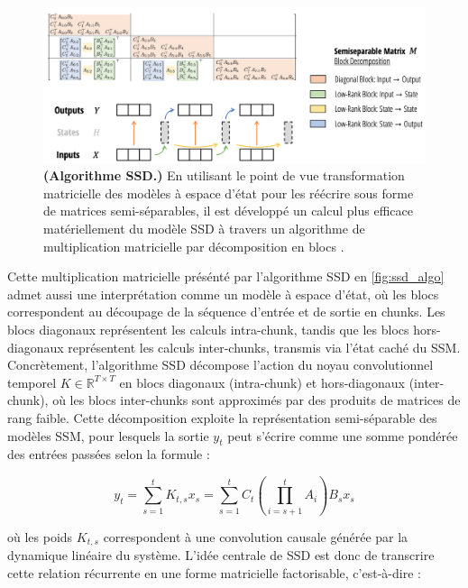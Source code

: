 \begin{figure}[H]
    \centering
    \includegraphics[width=1.0\linewidth]{images/sdd_algorithm.png}
    \caption{\justifying \textbf{(Algorithme SSD.)} En utilisant le point de vue transformation matricielle des modèles à espace d'état pour les réécrire sous forme de matrices semi-séparables, il est développé un calcul plus efficace matériellement du modèle SSD à travers un algorithme de multiplication matricielle par décomposition en blocs \citep{dao2024mamba2}.}
    \label{fig:ssd_algo}
\end{figure}

Cette multiplication matricielle présénté par l'algorithme SSD en \autoref{fig:ssd_algo} admet aussi une interprétation comme un modèle à espace d'état, où les blocs correspondent au découpage de la séquence d'entrée et de sortie en chunks. Les blocs diagonaux représentent les calculs intra-chunk, tandis que les blocs hors-diagonaux représentent les calculs inter-chunks, transmis via l'état caché du SSM. Concrètement, l'algorithme SSD décompose l'action du noyau convolutionnel temporel $K \in \mathbb{R}^{T \times T}$ en blocs diagonaux (intra-chunk) et hors-diagonaux (inter-chunk), où les blocs inter-chunks sont approximés par des produits de matrices de rang faible. Cette décomposition exploite la représentation semi-séparable des modèles SSM, pour lesquels la sortie $y_t$ peut s’écrire comme une somme pondérée des entrées passées selon la formule :

\begin{equation}
y_t = \sum_{s=1}^t K_{t,s} x_s = \sum_{s=1}^t C_t \left( \prod_{i=s+1}^{t} A_i \right) B_s x_s
\end{equation}

où les poids $K_{t,s}$ correspondent à une convolution causale générée par la dynamique linéaire du système. L’idée centrale de SSD est donc de transcrire cette relation récurrente en une forme matricielle factorisable, c’est-à-dire :


